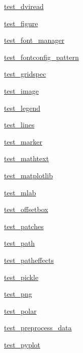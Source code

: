 \begin{DoxyCompactItemize}
\item 
 \hyperlink{namespacematplotlib_1_1tests_1_1test__dviread}{test\+\_\+dviread}
\item 
 \hyperlink{namespacematplotlib_1_1tests_1_1test__figure}{test\+\_\+figure}
\item 
 \hyperlink{namespacematplotlib_1_1tests_1_1test__font__manager}{test\+\_\+font\+\_\+manager}
\item 
 \hyperlink{namespacematplotlib_1_1tests_1_1test__fontconfig__pattern}{test\+\_\+fontconfig\+\_\+pattern}
\item 
 \hyperlink{namespacematplotlib_1_1tests_1_1test__gridspec}{test\+\_\+gridspec}
\item 
 \hyperlink{namespacematplotlib_1_1tests_1_1test__image}{test\+\_\+image}
\item 
 \hyperlink{namespacematplotlib_1_1tests_1_1test__legend}{test\+\_\+legend}
\item 
 \hyperlink{namespacematplotlib_1_1tests_1_1test__lines}{test\+\_\+lines}
\item 
 \hyperlink{namespacematplotlib_1_1tests_1_1test__marker}{test\+\_\+marker}
\item 
 \hyperlink{namespacematplotlib_1_1tests_1_1test__mathtext}{test\+\_\+mathtext}
\item 
 \hyperlink{namespacematplotlib_1_1tests_1_1test__matplotlib}{test\+\_\+matplotlib}
\item 
 \hyperlink{namespacematplotlib_1_1tests_1_1test__mlab}{test\+\_\+mlab}
\item 
 \hyperlink{namespacematplotlib_1_1tests_1_1test__offsetbox}{test\+\_\+offsetbox}
\item 
 \hyperlink{namespacematplotlib_1_1tests_1_1test__patches}{test\+\_\+patches}
\item 
 \hyperlink{namespacematplotlib_1_1tests_1_1test__path}{test\+\_\+path}
\item 
 \hyperlink{namespacematplotlib_1_1tests_1_1test__patheffects}{test\+\_\+patheffects}
\item 
 \hyperlink{namespacematplotlib_1_1tests_1_1test__pickle}{test\+\_\+pickle}
\item 
 \hyperlink{namespacematplotlib_1_1tests_1_1test__png}{test\+\_\+png}
\item 
 \hyperlink{namespacematplotlib_1_1tests_1_1test__polar}{test\+\_\+polar}
\item 
 \hyperlink{namespacematplotlib_1_1tests_1_1test__preprocess__data}{test\+\_\+preprocess\+\_\+data}
\item 
 \hyperlink{namespacematplotlib_1_1tests_1_1test__pyplot}{test\+\_\+pyplot}

\end{DoxyCompactItemize}

